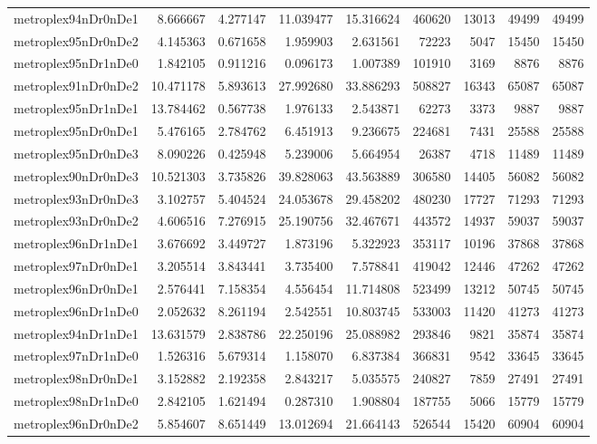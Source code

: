 \begin{longtable}{|l|r|r|r|r|r|r|r|r|}
metroplex94nDr0nDe1 & 8.666667 & 4.277147 & 11.039477 & 15.316624 & 460620 & 13013 & 49499 & 49499 \\
metroplex95nDr0nDe2 & 4.145363 & 0.671658 & 1.959903 & 2.631561 & 72223 & 5047 & 15450 & 15450 \\
metroplex95nDr1nDe0 & 1.842105 & 0.911216 & 0.096173 & 1.007389 & 101910 & 3169 & 8876 & 8876 \\
metroplex91nDr0nDe2 & 10.471178 & 5.893613 & 27.992680 & 33.886293 & 508827 & 16343 & 65087 & 65087 \\
metroplex95nDr1nDe1 & 13.784462 & 0.567738 & 1.976133 & 2.543871 & 62273 & 3373 & 9887 & 9887 \\
metroplex95nDr0nDe1 & 5.476165 & 2.784762 & 6.451913 & 9.236675 & 224681 & 7431 & 25588 & 25588 \\
metroplex95nDr0nDe3 & 8.090226 & 0.425948 & 5.239006 & 5.664954 & 26387 & 4718 & 11489 & 11489 \\
metroplex90nDr0nDe3 & 10.521303 & 3.735826 & 39.828063 & 43.563889 & 306580 & 14405 & 56082 & 56082 \\
metroplex93nDr0nDe3 & 3.102757 & 5.404524 & 24.053678 & 29.458202 & 480230 & 17727 & 71293 & 71293 \\
metroplex93nDr0nDe2 & 4.606516 & 7.276915 & 25.190756 & 32.467671 & 443572 & 14937 & 59037 & 59037 \\
metroplex96nDr1nDe1 & 3.676692 & 3.449727 & 1.873196 & 5.322923 & 353117 & 10196 & 37868 & 37868 \\
metroplex97nDr0nDe1 & 3.205514 & 3.843441 & 3.735400 & 7.578841 & 419042 & 12446 & 47262 & 47262 \\
metroplex96nDr0nDe1 & 2.576441 & 7.158354 & 4.556454 & 11.714808 & 523499 & 13212 & 50745 & 50745 \\
metroplex96nDr1nDe0 & 2.052632 & 8.261194 & 2.542551 & 10.803745 & 533003 & 11420 & 41273 & 41273 \\
metroplex94nDr1nDe1 & 13.631579 & 2.838786 & 22.250196 & 25.088982 & 293846 & 9821 & 35874 & 35874 \\
metroplex97nDr1nDe0 & 1.526316 & 5.679314 & 1.158070 & 6.837384 & 366831 & 9542 & 33645 & 33645 \\
metroplex98nDr0nDe1 & 3.152882 & 2.192358 & 2.843217 & 5.035575 & 240827 & 7859 & 27491 & 27491 \\
metroplex98nDr1nDe0 & 2.842105 & 1.621494 & 0.287310 & 1.908804 & 187755 & 5066 & 15779 & 15779 \\
metroplex96nDr0nDe2 & 5.854607 & 8.651449 & 13.012694 & 21.664143 & 526544 & 15420 & 60904 & 60904 \\

\end{longtable}

